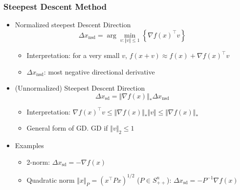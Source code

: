 \subsubsection*{Steepest Descent Method}
\begin{itemize}
    \item Normalized steepest Descent Direction
    \begin{equation}
        \Delta x_\mathrm{nsd}=\arg\min_{v:\Vert v\Vert\leq 1} \left\{\nabla f(x)^{\top} v\right\}
    \end{equation}
    \begin{itemize}
        \item Interpretation: for a very small $v$, $f(x+v)\approx f(x)+\nabla f(x)^{\top} v$
        \item $\Delta x_{\mathrm{nsd}}$: most negative directional derivative
    \end{itemize}
    \item (Unnormalized) Steepest Descent Direction
    \begin{equation}
        \Delta x_\mathrm{sd}=\Vert\nabla f(x)\Vert_\ast\Delta x_\mathrm{nsd}
    \end{equation}
    \begin{itemize}
        \item Interpretation: $\nabla f(x)^{\top}v\leq\Vert\nabla f(x)\Vert_\ast\Vert v\Vert\leq\Vert\nabla f(x)\Vert_\ast$
        \item General form of GD. GD if $\Vert v\Vert_2\leq 1$
    \end{itemize}
    \item Examples
    \begin{itemize}
        \item 2-norm: $\Delta x_\mathrm{sd} = -\nabla f(x)$
        \item Quadratic norm $\Vert x\Vert_P=(x^{\top}Px)^{1/2}$ ($P\in S_{++}^n$): $\Delta x_\mathrm{sd}=-P^{-1}\nabla f(x)$
    \end{itemize}
\end{itemize}

